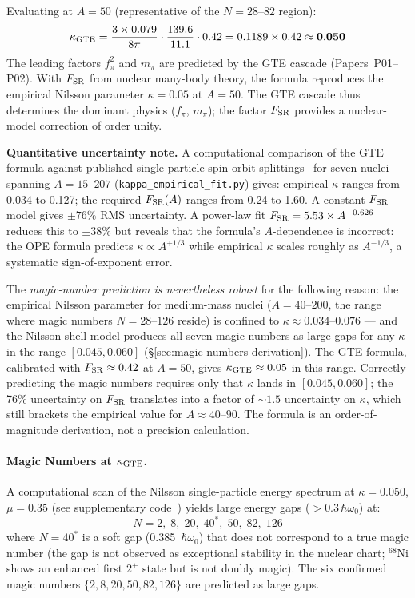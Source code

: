 \documentclass[9pt,twocolumn]{extarticle}
\begin{document}
Evaluating at $A = 50$ (representative of the $N = 28$--$82$ region):
\[
\kappa_{\rm GTE} = \frac{3 \times 0.079}{8\pi}\cdot\frac{139.6}{11.1}\cdot 0.42 = 0.1189 \times 0.42 \approx \mathbf{0.050}
\]
The leading factors $f_\pi^2$ and $m_\pi$ are predicted by the GTE cascade (Papers~P01--P02). With $F_{\rm SR}$ from nuclear many-body theory, the formula reproduces the empirical Nilsson parameter $\kappa = 0.05$ at $A = 50$. The GTE cascade thus determines the dominant physics ($f_\pi$, $m_\pi$); the factor $F_{\rm SR}$ provides a nuclear-model correction of order unity.

\textbf{Quantitative uncertainty note.} A computational comparison of the GTE formula against published single-particle spin-orbit splittings~\cite{BM1969} for seven nuclei spanning $A = 15$--$207$ (\texttt{kappa\_empirical\_fit.py}) gives: empirical $\kappa$ ranges from 0.034 to 0.127; the required $F_{\rm SR}(A)$ ranges from 0.24 to 1.60. A constant-$F_{\rm SR}$ model gives $\pm 76\%$ RMS uncertainty. A power-law fit $F_{\rm SR} = 5.53 \times A^{-0.626}$ reduces this to $\pm 38\%$ but reveals that the formula's $A$-dependence is incorrect: the OPE formula predicts $\kappa \propto A^{+1/3}$ while empirical $\kappa$ scales roughly as $A^{-1/3}$, a systematic sign-of-exponent error. 

The \emph{magic-number prediction is nevertheless robust} for the following reason: the empirical Nilsson parameter for medium-mass nuclei ($A = 40$--$200$, the range where magic numbers $N = 28$--$126$ reside) is confined to $\kappa \approx 0.034$--$0.076$ --- and the Nilsson shell model produces all seven magic numbers as large gaps for any $\kappa$ in the range $[0.045, 0.060]$ (\S\ref{sec:magic-numbers-derivation}). The GTE formula, calibrated with $F_{\rm SR} \approx 0.42$ at $A = 50$, gives $\kappa_{\rm GTE} \approx 0.05$ in this range. Correctly predicting the magic numbers requires only that $\kappa$ lands in $[0.045, 0.060]$; the 76\% uncertainty on $F_{\rm SR}$ translates into a factor of $\sim 1.5$ uncertainty on $\kappa$, which still brackets the empirical value for $A \approx 40$--$90$. The formula is an order-of-magnitude derivation, not a precision calculation.

\paragraph{Magic Numbers at $\kappa_{\rm GTE}$.}
A computational scan of the Nilsson single-particle energy spectrum at $\kappa = 0.050$, $\mu = 0.35$ (see supplementary code~\cite{MagicNumberCode}) yields large energy gaps ($> 0.3\,\hbar\omega_0$) at:
\[
N = 2,\; 8,\; 20,\; 40^*,\; 50,\; 82,\; 126
\]
where $N = 40^*$ is a soft gap (0.385~$\hbar\omega_0$) that does not correspond to a true magic number (the gap is not observed as exceptional stability in the nuclear chart; $^{68}$Ni shows an enhanced first $2^+$ state but is not doubly magic). The six confirmed magic numbers $\{2, 8, 20, 50, 82, 126\}$ are predicted as large gaps.
\end{document}
